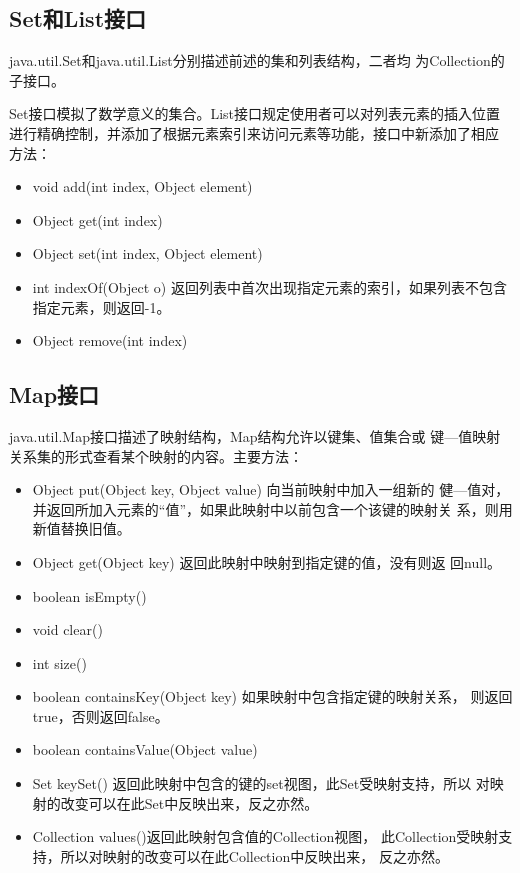 \subsection{Set和List接口}

java.util.Set和java.util.List分别描述前述的集和列表结构，二者均
为Collection的子接口。

Set接口模拟了数学意义的集合。List接口规定使用者可以对列表元素的插入位置
进行精确控制，并添加了根据元素索引来访问元素等功能，接口中新添加了相应
方法：

\begin{itemize}
\item void add(int index, Object element)
\item Object get(int index)
\item Object set(int index, Object element) 
\item int indexOf(Object o) 返回列表中首次出现指定元素的索引，如果列表不包含指定元素，则返回-1。
\item Object remove(int index)
\end{itemize}

\subsection{Map接口}

java.util.Map接口描述了映射结构，Map结构允许以{\hei\Blue 键集、值集合或
  键—值映射关系集}的形式查看某个映射的内容。主要方法：
  
\begin{itemize}
\item Object put(Object key, Object value) 向当前映射中加入一组新的
  健—值对，并返回所加入元素的“值”，如果此映射中以前包含一个该键的映射关
  系，则用新值替换旧值。
\item Object get(Object key) 返回此映射中映射到指定键的值，没有则返
  回null。
\item boolean isEmpty()
\item void clear()
\item int size()
\item boolean containsKey(Object key) 如果映射中包含指定键的映射关系，
  则返回true，否则返回false。
\item boolean containsValue(Object value)
\item Set keySet() 返回此映射中包含的键的set视图，此Set受映射支持，所以
  对映射的改变可以在此Set中反映出来，反之亦然。
\item Collection values()返回此映射包含值的Collection视图，
  此Collection受映射支持，所以对映射的改变可以在此Collection中反映出来，
  反之亦然。
\end{itemize}

